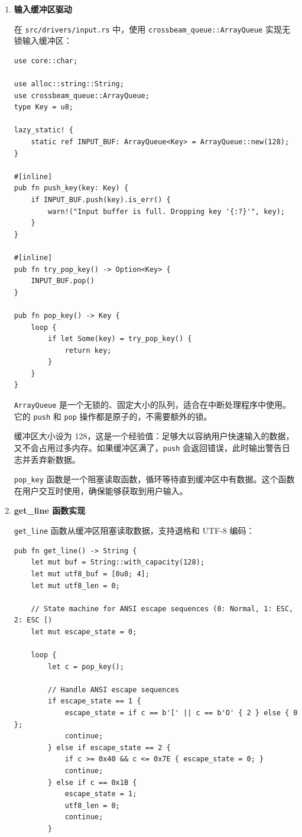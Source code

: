 \documentclass{SYSUReport}
\begin{document}
\begin{enumerate}[label={\chinese*、},labelsep=0pt, start=8]
    \item \textbf{输入缓冲区驱动}

    在 \texttt{src/drivers/input.rs} 中，使用 \texttt{crossbeam\_queue::ArrayQueue} 实现无锁输入缓冲区：

    \begin{verbatim}
use core::char;

use alloc::string::String;
use crossbeam_queue::ArrayQueue;
type Key = u8;

lazy_static! {
    static ref INPUT_BUF: ArrayQueue<Key> = ArrayQueue::new(128);
}

#[inline]
pub fn push_key(key: Key) {
    if INPUT_BUF.push(key).is_err() {
        warn!("Input buffer is full. Dropping key '{:?}'", key);
    }
}

#[inline]
pub fn try_pop_key() -> Option<Key> {
    INPUT_BUF.pop()
}

pub fn pop_key() -> Key {
    loop {
        if let Some(key) = try_pop_key() {
            return key;
        }
    }
}
    \end{verbatim}

    \texttt{ArrayQueue} 是一个无锁的、固定大小的队列，适合在中断处理程序中使用。它的 \texttt{push} 和 \texttt{pop} 操作都是原子的，不需要额外的锁。

    缓冲区大小设为 128，这是一个经验值：足够大以容纳用户快速输入的数据，又不会占用过多内存。如果缓冲区满了，\texttt{push} 会返回错误，此时输出警告日志并丢弃新数据。

    \texttt{pop\_key} 函数是一个阻塞读取函数，循环等待直到缓冲区中有数据。这个函数在用户交互时使用，确保能够获取到用户输入。

    \item \textbf{get\_line 函数实现}

    \texttt{get\_line} 函数从缓冲区阻塞读取数据，支持退格和 UTF-8 编码：

    \begin{verbatim}
pub fn get_line() -> String {
    let mut buf = String::with_capacity(128);
    let mut utf8_buf = [0u8; 4];
    let mut utf8_len = 0;

    // State machine for ANSI escape sequences (0: Normal, 1: ESC, 2: ESC [)
    let mut escape_state = 0;

    loop {
        let c = pop_key();
        
        // Handle ANSI escape sequences
        if escape_state == 1 {
            escape_state = if c == b'[' || c == b'O' { 2 } else { 0 };
            continue;
        } else if escape_state == 2 {
            if c >= 0x40 && c <= 0x7E { escape_state = 0; }
            continue;
        } else if c == 0x1B {
            escape_state = 1;
            utf8_len = 0;
            continue;
        }


\end{verbatim}
\end{enumerate}
\end{document}
